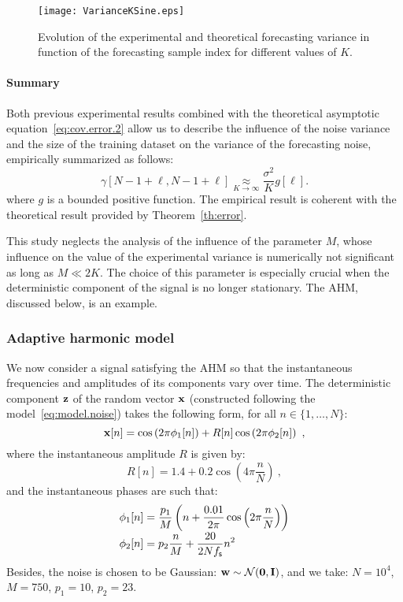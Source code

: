 \begin{figure}
\texttt{[image: VarianceKSine.eps]}
\caption{Evolution of the experimental and theoretical forecasting variance in function of the forecasting sample index for different values of $K$.}
\label{fig:res.size.sine}
\end{figure}

\paragraph{Summary}
Both previous experimental results combined with the theoretical asymptotic equation~\eqref{eq:cov.error.2} allow us to describe the influence of the noise variance and the size of the training dataset on the variance of the forecasting noise, empirically summarized as follows:
\begin{equation}
\gamma[N-1+\ell,N-1+\ell] \underset{K\to\infty}{\approx} \dfrac{\sigma^2}{K}g[\ell] .
\end{equation} 
where $g$ is a bounded positive function. The empirical result is coherent with the theoretical result provided by Theorem~\ref{th:error}.

This study neglects the analysis of the influence of the parameter $M$, whose influence on the value of the experimental variance is numerically not significant as long as $M\ll 2K$. The choice of this parameter is especially crucial when the deterministic component of the signal is no longer stationary. The AHM, discussed below, is an example.

\subsubsection{Adaptive harmonic model}
\label{ssse:res.ahm}
We now consider a signal satisfying the AHM so that the instantaneous frequencies and amplitudes of its components vary over time. The deterministic component ${\mathbf z}$ of the random vector ${\mathbf x}$ (constructed following the model~\eqref{eq:model.noise}) takes the following form, for all $n\in\{1,\ldots,N\}$:
\[
{\mathbf x}[n] = \cos\left(2\pi \phi_1[n] \right) + R[n]\cos\left(2\pi \phi_2[n] \right) \ ,
\] 
where the instantaneous amplitude $R$ is given by:
\[
R[n] = 1.4 + 0.2\cos\left(4\pi\frac{n}{N}\right)\ ,
\]
and the instantaneous phases are such that:
\begin{align*}
\phi_1[n] &= \frac{p_1}{M}\left( n + \frac{0.01}{2\pi}\cos\left(2\pi\frac{n}{N}\right) \right) \\[-1mm]
\phi_2[n] & = p_2\frac{n}{M} + \frac{20}{2Nf_{\mathsf s}}n^2
\end{align*}
Besides, the noise is chosen to be Gaussian: ${\mathbf w}\sim{\mathcal N}(\boldsymbol{0},{\mathbf I})$, and we take: $N=10^4$, $M=750$, $p_1=10$, $p_2=23$.

